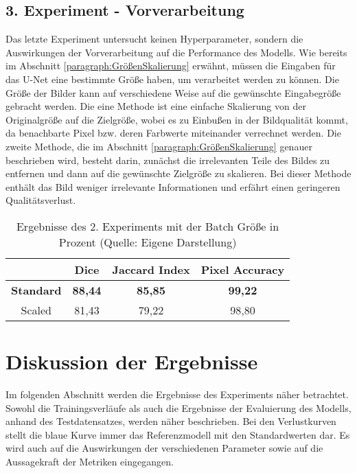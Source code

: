 \subsection{3. Experiment - Vorverarbeitung}
\label{subsec:3.Experiment-Vorverarbeitung}
Das letzte Experiment untersucht keinen Hyperparameter, sondern die Auswirkungen der Vorverarbeitung auf die Performance des \gls{Modell}s. Wie bereits im Abschnitt \ref{paragraph:GrößenSkalierung} erwähnt, müssen die Eingaben für das U-Net eine bestimmte Größe haben, um verarbeitet werden zu können. Die Größe der Bilder kann auf verschiedene Weise auf die gewünschte Eingabegröße gebracht werden. Die eine Methode ist eine einfache Skalierung von der Originalgröße auf die Zielgröße, wobei es zu Einbußen in der Bildqualität kommt, da benachbarte Pixel bzw. deren Farbwerte miteinander verrechnet werden. Die zweite Methode, die im Abschnitt \ref{paragraph:GrößenSkalierung} genauer beschrieben wird, besteht darin, zunächst die irrelevanten Teile des Bildes zu entfernen und dann auf die gewünschte Zielgröße zu skalieren. Bei dieser Methode enthält das Bild weniger irrelevante Informationen und erfährt einen geringeren Qualitätsverlust. 
\begin{table}[!h]
	\centering
	\begin{tabular}{|c|c|c|c|}
		\hline
		& Dice & Jaccard Index & Pixel Accuracy \\
		\hline
		\textbf{Standard}& \textbf{88,44} 	& \textbf{85,85}  	& \textbf{99,22}  \\
		\hline
		Scaled		& 81,43  	& 79,22 	& 98,80 \\
		\hline
	\end{tabular}
	\caption{Ergebnisse des 2. Experiments mit der Batch Größe in Prozent (Quelle: Eigene Darstellung)}
	\label{table:3.ExperimentErgebnisse}
\end{table}

\section{Diskussion der Ergebnisse}
Im folgenden Abschnitt werden die Ergebnisse des Experiments näher betrachtet. Sowohl die Trainingsverläufe als auch die Ergebnisse der Evaluierung des \gls{Modell}s, anhand des Testdatensatzes, werden näher beschrieben. Bei den Verlustkurven stellt die blaue Kurve immer das Referenzmodell mit den Standardwerten dar. Es wird auch auf die Auswirkungen der verschiedenen Parameter sowie auf die Aussagekraft der Metriken eingegangen. 

